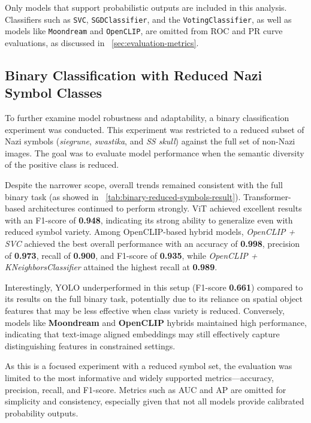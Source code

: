 Only models that support probabilistic outputs are included in this analysis. Classifiers such as \texttt{\ac{SVC}},
\texttt{SGDClassifier}, and the \texttt{VotingClassifier}, as well as models like \texttt{Moondream} and
\texttt{OpenCLIP}, are omitted from \ac{ROC} and \ac{PR} curve evaluations, as discussed in
~\autoref{sec:evaluation-metrics}.

\subsection{Binary Classification with Reduced Nazi Symbol Classes}

To further examine model robustness and adaptability, a binary classification experiment was conducted. This
experiment was restricted to a reduced subset of Nazi symbols (\textit{siegrune}, \textit{swastika}, and
\textit{\ac{SS} skull}) against the full set of non-Nazi images. The goal was to evaluate model performance when the
semantic diversity of the positive class is reduced.

Despite the narrower scope, overall trends remained consistent with the full binary task (as showed in
~\autoref{tab:binary-reduced-symbols-result}). Transformer-based
architectures continued to perform strongly. \ac{ViT} achieved excellent results with an F1-score of \textbf{0.948},
indicating its strong ability to generalize even with reduced symbol variety. Among OpenCLIP-based hybrid models,
\textit{OpenCLIP + \ac{SVC}} achieved the best overall performance with an accuracy of \textbf{0.998},
precision of \textbf{0.973}, recall of \textbf{0.900}, and F1-score of \textbf{0.935}, while
\textit{OpenCLIP + KNeighborsClassifier} attained the highest recall at \textbf{0.989}.

Interestingly, \ac{YOLO} underperformed in this setup (F1-score \textbf{0.661}) compared to its results on the full
binary task, potentially due to its reliance on spatial object features that may be less effective when class
variety is reduced. Conversely, models like \textbf{Moondream} and \textbf{OpenCLIP} hybrids maintained high performance, indicating
that text-image aligned embeddings may still effectively capture distinguishing features in constrained settings.

As this is a focused experiment with a reduced symbol set, the evaluation was limited to the most informative and widely
supported metrics—accuracy, precision, recall, and F1-score. Metrics such as \ac{AUC} and \ac{AP} are omitted for
simplicity and consistency, especially given that not all models provide calibrated probability outputs.

